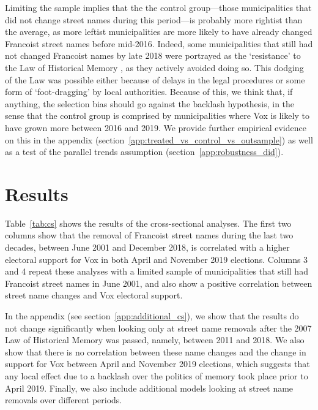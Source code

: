 \documentclass[12pt, notitlepage]{article}
\begin{document}
Limiting the sample implies that the the control group---those municipalities that did not change street names during this period---is probably more rightist than the average, as more leftist municipalities are more likely to have already changed Francoist street names before mid-2016.
Indeed, some municipalities that still had not changed Francoist names by late 2018 were portrayed as the `resistance' to the Law of Historical Memory \citep{Blanco-Elipe:2018aa}, as they actively avoided doing so.
This dodging of the Law was possible either because of delays in the legal procedures or some form of `foot-dragging' by local authorities.
Because of this, we think that, if anything, the selection bias should go against the backlash hypothesis, in the sense that the control group is comprised by municipalities where Vox is likely to have grown more between 2016 and 2019.
We provide further empirical evidence on this in the appendix (section~\ref{app:treated_vs_control_vs_outsample}) as well as a test of the parallel trends assumption (section~\ref{app:robustness_did}).


\section*{Results}

Table~\ref{tab:cs} shows the results of the cross-sectional analyses.
The first two columns show that the removal of Francoist street names during the last two decades, between June 2001 and December 2018, is correlated with a higher electoral support for Vox in both April and November 2019 elections.
Columns 3 and 4 repeat these analyses with a limited sample of municipalities that still had Francoist street names in June 2001, and also show a positive correlation between street name changes and Vox electoral support.



In the appendix (see section~\ref{app:additional_cs}), we show that the results do not change significantly when looking only at street name removals after the 2007 Law of Historical Memory was passed, namely, between 2011 and 2018.
We also show that there is no correlation between these name changes and the change in support for Vox between April and November 2019 elections, which suggests that any local effect due to a backlash over the politics of memory took place prior to April 2019.
Finally, we also include additional models looking at street name removals over different periods.
\end{document}
